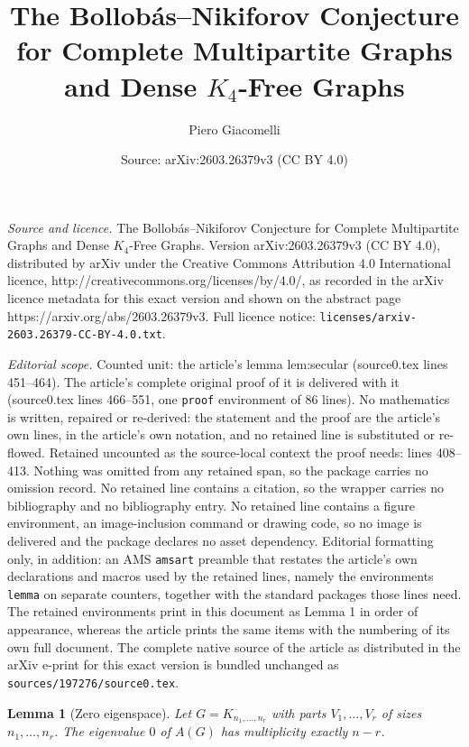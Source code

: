 \documentclass[10pt,a4paper]{amsart}
\title{The Bollob\'{a}s--Nikiforov Conjecture for Complete Multipartite Graphs and Dense $K_4$-Free Graphs}
\author{Piero Giacomelli}
\date{Source: arXiv:2603.26379v3 (CC BY 4.0)}
\newtheorem{lemma}{Lemma}
\begin{document}
\maketitle

\noindent\emph{Source and licence.} The Bollob\'{a}s--Nikiforov Conjecture for Complete Multipartite Graphs and Dense $K_4$-Free Graphs. Version arXiv:2603.26379v3 (CC BY 4.0), distributed by arXiv under the Creative Commons Attribution 4.0 International licence, http://creativecommons.org/licenses/by/4.0/, as recorded in the arXiv licence metadata for this exact version and shown on the abstract page https://arxiv.org/abs/2603.26379v3. Full licence notice: \texttt{licenses/arxiv-2603.26379-CC-BY-4.0.txt}.\par\smallskip

\noindent\textit{Editorial scope.} Counted unit: the article's lemma lem:secular (source0.tex lines 451--464). The article's complete original proof of it is delivered with it (source0.tex lines 466--551, one \texttt{proof} environment of 86 lines). No mathematics is written, repaired or re-derived: the statement and the proof are the article's own lines, in the article's own notation, and no retained line is substituted or re-flowed.  Retained uncounted as the source-local context the proof needs: lines 408--413.  Nothing was omitted from any retained span, so the package carries no omission record.  No retained line contains a citation, so the wrapper carries no bibliography and no bibliography entry.  No retained line contains a figure environment, an image-inclusion command or drawing code, so no image is delivered and the package declares no asset dependency.  Editorial formatting only, in addition: an AMS \texttt{amsart} preamble that restates the article's own declarations and macros used by the retained lines, namely the environments \texttt{lemma} on separate counters, together with the standard packages those lines need.  The retained environments print in this document as Lemma 1 in order of appearance, whereas the article prints the same items with the numbering of its own full document.  The complete native source of the article as distributed in the arXiv e-print for this exact version is bundled unchanged as \texttt{sources/197276/source0.tex}.
\begin{lemma}[Zero eigenspace]
  \label{lem:within}
  Let $G = K_{n_1,\ldots,n_r}$ with parts $V_1,\ldots,V_r$ of sizes
  $n_1,\ldots,n_r$.  The eigenvalue $0$ of $A(G)$ has multiplicity
  exactly $n - r$.
\end{lemma}
\end{document}
